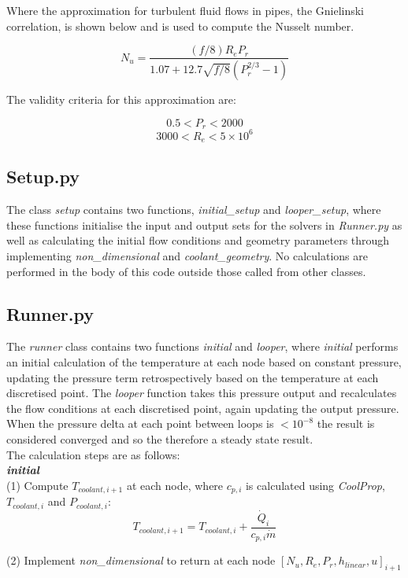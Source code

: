 \documentclass{article}
\begin{document}
Where the approximation for turbulent fluid flows in pipes, the Gnielinski correlation, is shown below and is used to compute the Nusselt number.  

\[N_{u}=\frac{(f/8)R_{e}P_{r}}{1.07+12.7\sqrt{f/8}(P_{r}^{2/3}-1)} \]

The validity criteria for this approximation are:

\[0.5 < P_{r} < 2000\]
\[3000 < R_{e} < 5\times10^{6}\]

\subsection{Setup.py}

The class \textit{setup} contains two functions, \textit{initial\_setup} and \textit{looper\_setup}, where these functions initialise the input and output sets for the solvers in \textit{Runner.py} as well as calculating the initial flow conditions and geometry parameters through implementing \textit{non\_dimensional} and \textit{coolant\_geometry}. No calculations are performed in the body of this code outside those called from other classes.

\subsection{Runner.py}
The \textit{runner} class contains two functions \textit{initial} and \textit{looper}, where \textit{initial} performs an initial calculation of the temperature at each node based on constant pressure, updating the pressure term retrospectively based on the temperature at each discretised point. The \textit{looper} function takes this pressure output and recalculates the flow conditions at each discretised point, again updating the output pressure. When the pressure delta at each point between loops is $<10^{-8}$ the result is considered converged and so the therefore a steady state result. \\

The calculation steps are as follows: \\

\textbf{\textit{initial}}\\

(1) Compute $T_{coolant, i+1}$ at each node, where $c_{p,i}$ is calculated using \textit{CoolProp}, $T_{coolant,i}$ and $P_{coolant,i}$:
\[T_{coolant, i+1}=T_{coolant, i} + \frac{\dot{Q}_{i}} {c_{p, i}\dot{m}}\] 

(2) Implement \textit{non\_dimensional} to return at each node $[N_{u}, R_{e}, P_{r}, h_{linear}, u]_{i+1}$ 
\end{document}
